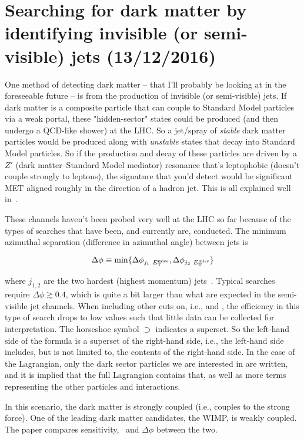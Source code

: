 \newpage
\chapter{Searching for dark matter by identifying invisible (or semi-visible) jets (13/12/2016)}
\label{sec:svjoverview}

One method of detecting dark matter -- that I'll probably be looking at in the foreseeable future -- is from the production of invisible (or semi-visible) jets. If dark matter is a composite particle that can couple to Standard Model particles via a weak portal, these "hidden-sector" states could be produced (and then undergo a QCD-like shower) at the LHC. So a jet/spray of \emph{stable} dark matter particles would be produced along with \emph{unstable} states that decay into Standard Model particles. So if the production and decay of these particles are driven by a $Z'$ (dark matter--Standard Model mediator) resonance that's leptophobic (doesn't couple strongly to leptons), the signature that you'd detect would be significant MET aligned roughly in the direction of a hadron jet. This is all explained well in~\cite{Cohen:2015toa}.

These channels haven't been probed very well at the LHC so far because of the types of searches that have been, and currently are, conducted. The minimum azimuthal separation (difference in azimuthal angle) between jets is

\begin{equation}
\Delta\phi \equiv \min \{ \Delta\phi_{j_1 \ E_{\mathrm{T}}^{\text{miss}}}, \Delta\phi_{j_2 \ E_{\mathrm{T}}^{\text{miss}}} \}
\end{equation}

where $j_{1, 2}$ are the two hardest (highest momentum) jets~\cite{Cohen:2015toa}. Typical searches require $\Delta\phi \gtrsim 0.4$, which is quite a bit larger than what are expected in the semi-visible jet channels. When including other cuts on, i.e., \etmiss and \alphat, the efficiency in this type of search drops to low values such that little data can be collected for interpretation. The horseshoe symbol $\supset$ indicates a superset. So the left-hand side of the formula is a superset of the right-hand side, i.e., the left-hand side includes, but is not limited to, the contents of the right-hand side. In the case of the Lagrangian, only the dark sector particles we are interested in are written, and it is implied that the full Lagrangian contains that, as well as more terms representing the other particles and interactions.

In this scenario, the dark matter is strongly coupled (i.e., couples to the strong force). One of the leading dark matter candidates, the WIMP, is weakly coupled. The paper compares sensitivity, \etmiss\ and $\Delta\phi$ between the two.

